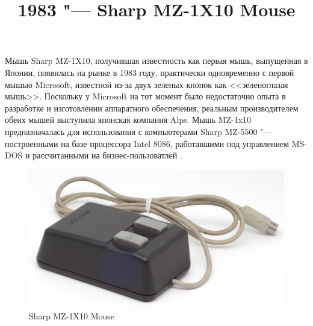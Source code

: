 \documentclass[11pt, a4paper]{article}
\begin{document}
\title{1983 "--- Sharp MZ-1X10 Mouse}
\date{}
\maketitle
{}

Мышь Sharp MZ-1X10, получившая известность как первая мышь, выпущенная в Японии, появилась на рынке в 1983 году, практически одновременно с первой мышью Microsoft, известной из-за двух зеленых кнопок как <<зеленоглазая мышь>>. Поскольку у Microsoft на тот момент было недостаточно опыта в разработке и изготовлении аппаратного обеспечения, реальным производителем обеих мышей выступила японская компания Alps. Мышь MZ-1x10 предназначалась для использования с компьютерами Sharp MZ-5500 "--- построенными на базе процессора Intel 8086, работавшими под управлением MS-DOS и рассчитанными на бизнес-пользоватлей \cite{review, wiki}.

\begin{figure}[h]
   \centering
    \includegraphics[scale=0.7]{1983_sharp_mz_1x10_mouse/pic_30.jpg}
    \caption{Sharp MZ-1X10 Mouse}
    \label{fig:SharpMZ1x10Pic}
\end{figure}
\end{document}
